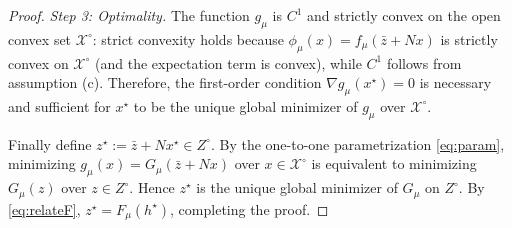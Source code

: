 \documentclass[11pt]{article}
\theoremstyle{plain}
\theoremstyle{definition}
\begin{document}
\begin{proof}
\smallskip
\noindent\emph{Step 3: Optimality.}
The function $g_\mu$ is $C^1$ and strictly convex on the open convex set $\mathcal{X}^\circ$:
strict convexity holds because $\phi_\mu(x)=f_\mu(\bar z+Nx)$ is strictly convex on $\mathcal{X}^\circ$
(and the expectation term is convex), while $C^1$ follows from assumption (c).
Therefore, the first-order condition $\nabla g_\mu(x^\star)=0$ is necessary and sufficient for $x^\star$
to be the unique global minimizer of $g_\mu$ over $\mathcal{X}^\circ$.

Finally define $z^\star:=\bar z+N x^\star\in Z^\circ$. By the one-to-one parametrization \eqref{eq:param},
minimizing $g_\mu(x)=G_\mu(\bar z+Nx)$ over $x\in \mathcal{X}^\circ$ is equivalent to minimizing $G_\mu(z)$
over $z\in Z^\circ$. Hence $z^\star$ is the unique global minimizer of $G_\mu$ on $Z^\circ$.
By \eqref{eq:relateF}, $z^\star = F_\mu(h^\star)$, completing the proof.
\end{proof}

\end{document}
